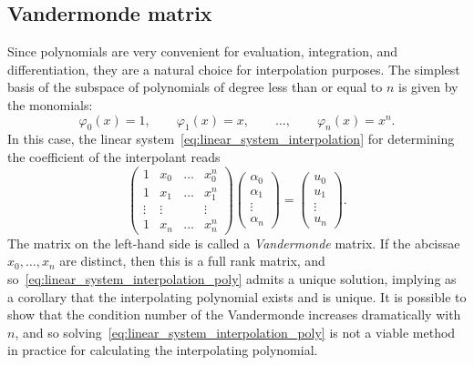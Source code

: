 \subsection{Vandermonde matrix}
Since polynomials are very convenient for evaluation, integration, and differentiation,
they are a natural choice for interpolation purposes.
The simplest basis of the subspace of polynomials of degree less than or equal to $n$ is given by the monomials:
\[
    \varphi_0(x) = 1,
    \qquad
    \varphi_1(x) = x,
    \qquad \dotsc, \qquad
    \varphi_n(x) = x^n.
\]
In this case,
the linear system~\eqref{eq:linear_system_interpolation} for determining the coefficient of the interpolant reads
\begin{equation}
    \label{eq:linear_system_interpolation_poly}
    \begin{pmatrix}
        1 & x_0 & \hdots & x_0^n \\
        1 & x_1 & \hdots & x_1^n \\
        \vdots & \vdots & & \vdots \\
        1 & x_n & \hdots & x_n^n
    \end{pmatrix}
    \begin{pmatrix}
        \alpha_0 \\
        \alpha_1 \\
        \vdots \\
        \alpha_n
    \end{pmatrix}
    =
    \begin{pmatrix}
        u_0 \\
        u_1 \\
        \vdots \\
        u_n
    \end{pmatrix}.
\end{equation}
The matrix on the left-hand side is called a \emph{Vandermonde} matrix.
If the abcissae $x_0, \dotsc, x_n$ are distinct,
then this is a full rank matrix,
and so~\eqref{eq:linear_system_interpolation_poly} admits a unique solution,
implying as a corollary that the interpolating polynomial exists and is unique.
It is possible to show that the condition number of the Vandermonde increases dramatically with $n$,
and so solving~\eqref{eq:linear_system_interpolation_poly} is not a viable method in practice for calculating the interpolating polynomial.

